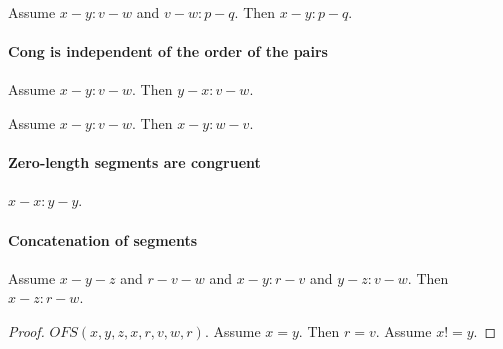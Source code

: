 \documentclass{article}
\begin{document}
  \begin{forthel}
    \begin{lemma}[L2_3]
      Assume $x-y : v-w$ and $v-w : p-q$. Then $x-y : p-q$.
    \end{lemma}
  \end{forthel}


  \paragraph{Cong is independent of the order of the pairs}

  \begin{forthel}
    \begin{lemma}[L2_4]
      Assume $x-y : v-w$. Then $y-x : v-w$.
    \end{lemma}

    \begin{lemma}[L2_5]
      Assume $x-y : v-w$. Then $x-y : w-v$.
    \end{lemma}
  \end{forthel}


  \paragraph{Zero-length segments are congruent}

  \begin{forthel}
    \begin{lemma}[L2_8]
      $x-x : y-y$.
    \end{lemma}
  \end{forthel}


  \paragraph{Concatenation of segments}

  \begin{forthel}
    \begin{lemma}[L2_11]
      Assume $x-y-z$ and $r-v-w$ and $x-y : r-v$ and $y-z : v-w$. Then $x-z : r-w$.
    \end{lemma}


    \begin{proof}
      $OFS(x,y,z,x,r,v,w,r)$.       %
      Assume $x = y$. Then $r = v$. %
      Assume $x != y$.              %
    \end{proof}
  \end{forthel}
\end{document}
